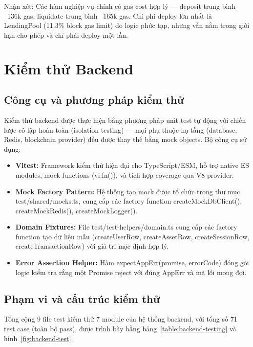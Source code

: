 \documentclass[../DoAn.tex]{subfiles}
\begin{document}
Nhận xét: Các hàm nghiệp vụ chính có gas cost hợp lý --- deposit trung bình ~136k gas, liquidate trung bình ~165k gas. Chi phí deploy lớn nhất là LendingPool (11.3\% block gas limit) do logic phức tạp, nhưng vẫn nằm trong giới hạn cho phép và chỉ phải deploy một lần.

\section{Kiểm thử Backend}


\subsection{Công cụ và phương pháp kiểm thử}


Kiểm thử backend được thực hiện bằng phương pháp unit test tự động với chiến lược cô lập hoàn toàn (isolation testing) --- mọi phụ thuộc hạ tầng (database, Redis, blockchain provider) đều được thay thế bằng mock objects. Bộ công cụ sử dụng:

\begin{itemize}
  \item \textbf{Vitest:} Framework kiểm thử hiện đại cho TypeScript/ESM, hỗ trợ native ES modules, mock functions (vi.fn()), và tích hợp coverage qua V8 provider.
  \item \textbf{Mock Factory Pattern:} Hệ thống tạo mock được tổ chức trong thư mục test/shared/mocks.ts, cung cấp các factory function createMockDbClient(), createMockRedis(), createMockLogger().
  \item \textbf{Domain Fixtures:} File test/test-helpers/domain.ts cung cấp các factory function tạo dữ liệu mẫu (createUserRow, createAssetRow, createSessionRow, createTransactionRow) với giá trị mặc định hợp lý.
  \item \textbf{Error Assertion Helper:} Hàm expectAppErr(promise, errorCode) đóng gói logic kiểm tra rằng một Promise reject với đúng AppErr và mã lỗi mong đợi.
\end{itemize}


\subsection{Phạm vi và cấu trúc kiểm thử}


Tổng cộng 9 file test kiểm thử 7 module của hệ thống backend, với tổng số 71 test case (toàn bộ pass), được trình bày bằng bảng~\ref{table:backend-testing} và hình~\ref{fig:backend-test}.
\end{document}
